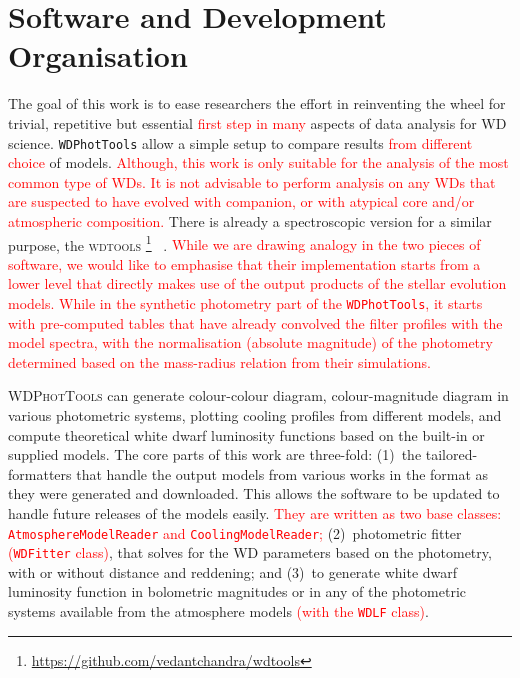 \documentclass[fleqn,usenatbib]{rasti}
\begin{document}
\section{Software and Development Organisation}
The goal of this work is to ease researchers the effort in reinventing the
wheel for trivial, repetitive but essential \textcolor{red}{first step in many}
aspects of data analysis for WD science. \texttt{WDPhotTools} allow a simple
setup to compare results \textcolor{red}{from different choice} of models.
\textcolor{red}{Although, this work is only suitable for the analysis of the
most common type of WDs. It is not advisable to perform analysis on any WDs
that are suspected to have evolved with companion, or with atypical core
and/or atmospheric composition.}
There is already a spectroscopic version for a similar purpose, the
\textsc{wdtools} \footnote{\url{https://github.com/vedantchandra/wdtools}}~
\citep{2020MNRAS.497.2688C}. \textcolor{red}{While we are drawing
analogy in the two pieces of software, we would like to emphasise that their
implementation starts from a lower level that directly makes use of the
output products of the stellar evolution models. While in the synthetic
photometry part of the \texttt{WDPhotTools}, it starts with pre-computed
tables that have already convolved the filter profiles with the model
spectra, with the normalisation (absolute magnitude) of the photometry
determined based on the mass-radius relation from their simulations.}

\textsc{WDPhotTools} can generate colour-colour diagram, colour-magnitude
diagram in various photometric systems, plotting cooling profiles from
different models, and compute theoretical white dwarf luminosity functions
based on the built-in or supplied models. The core parts of this work are
three-fold: (1)~the tailored-formatters that handle the output models from
various works in the format as they were generated and downloaded. This allows
the software to be updated to handle future releases of the models easily.
\textcolor{red}{They are written as two base classes:
\texttt{AtmosphereModelReader} and \texttt{CoolingModelReader};}
(2)~photometric fitter \textcolor{red}{(\texttt{WDFitter} class)}, that solves for
the WD parameters based on the photometry, with or without distance and
reddening; and (3)~to generate white dwarf luminosity function in
bolometric magnitudes or in any of the photometric systems available from the
atmosphere models \textcolor{red}{(with the \texttt{WDLF} class)}.
\end{document}
